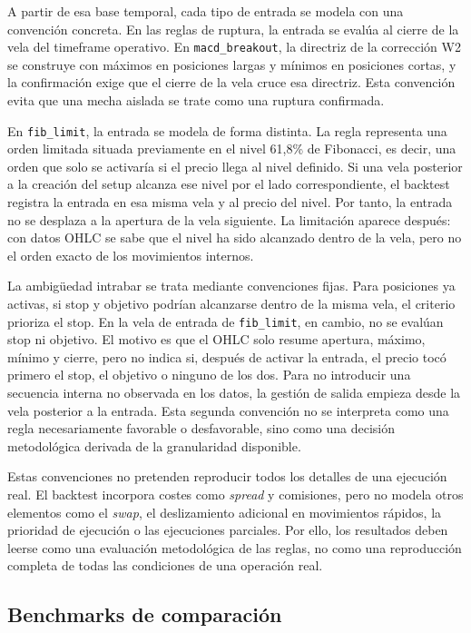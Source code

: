 A partir de esa base temporal, cada tipo de entrada se modela con una
convenci\'on concreta. En las reglas de ruptura, la entrada se eval\'ua al cierre
de la vela del timeframe operativo. En \texttt{macd\_breakout}, la directriz de la
correcci\'on W2 se construye con m\'aximos en posiciones largas y m\'inimos en
posiciones cortas, y la confirmaci\'on exige que el cierre de la vela cruce esa
directriz. Esta convenci\'on evita que una mecha aislada se trate como una
ruptura confirmada.

En \texttt{fib\_limit}, la entrada se modela de forma distinta. La regla
representa una orden limitada situada previamente en el nivel 61,8\% de
Fibonacci, es decir, una orden que solo se activar\'ia si el precio llega al nivel
definido. Si una vela posterior a la creaci\'on del setup alcanza ese nivel por
el lado correspondiente, el backtest registra la entrada en esa misma vela y al
precio del nivel. Por tanto, la entrada no se desplaza a la apertura de la vela
siguiente. La limitaci\'on aparece despu\'es: con datos OHLC se sabe que el nivel
ha sido alcanzado dentro de la vela, pero no el orden exacto de los movimientos
internos.

La ambig\"uedad intrabar se trata mediante convenciones fijas. Para posiciones
ya activas, si stop y objetivo podr\'ian alcanzarse dentro de la misma vela, el
criterio prioriza el stop. En la vela de entrada de \texttt{fib\_limit}, en
cambio, no se eval\'uan stop ni objetivo. El motivo es que el OHLC solo resume
apertura, m\'aximo, m\'inimo y cierre, pero no indica si, despu\'es de activar la
entrada, el precio toc\'o primero el stop, el objetivo o ninguno de los dos. Para
no introducir una secuencia interna no observada en los datos, la gesti\'on de
salida empieza desde la vela posterior a la entrada. Esta segunda convenci\'on no
se interpreta como una regla necesariamente favorable o desfavorable, sino como
una decisi\'on metodol\'ogica derivada de la granularidad disponible.

Estas convenciones no pretenden reproducir todos los detalles de una ejecuci\'on
real. El backtest incorpora costes como \textit{spread} y comisiones, pero no
modela otros elementos como el \textit{swap}, el deslizamiento adicional en
movimientos r\'apidos, la prioridad de ejecuci\'on o las ejecuciones parciales.
Por ello, los resultados deben leerse como una evaluaci\'on metodol\'ogica de las
reglas, no como una reproducci\'on completa de todas las condiciones de una
operaci\'on real.

\subsection{Benchmarks de comparaci\'on}
\label{subsec:benchmarks-comparacion}

